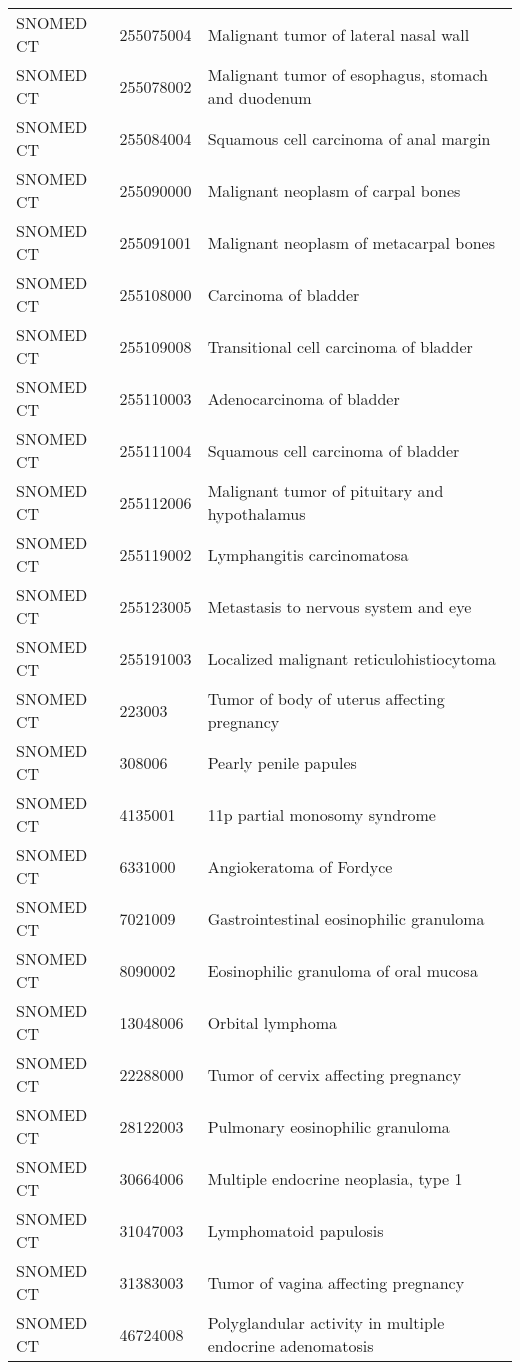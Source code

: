 \begin{longtable}{p{}p{}p{}}
  SNOMED CT & 255075004 & Malignant tumor of lateral nasal wall \\ 
  SNOMED CT & 255078002 & Malignant tumor of esophagus, stomach and duodenum \\ 
  SNOMED CT & 255084004 & Squamous cell carcinoma of anal margin \\ 
  SNOMED CT & 255090000 & Malignant neoplasm of carpal bones \\ 
  SNOMED CT & 255091001 & Malignant neoplasm of metacarpal bones \\ 
  SNOMED CT & 255108000 & Carcinoma of bladder \\ 
  SNOMED CT & 255109008 & Transitional cell carcinoma of bladder \\ 
  SNOMED CT & 255110003 & Adenocarcinoma of bladder \\ 
  SNOMED CT & 255111004 & Squamous cell carcinoma of bladder \\ 
  SNOMED CT & 255112006 & Malignant tumor of pituitary and hypothalamus \\ 
  SNOMED CT & 255119002 & Lymphangitis carcinomatosa \\ 
  SNOMED CT & 255123005 & Metastasis to nervous system and eye \\ 
  SNOMED CT & 255191003 & Localized malignant reticulohistiocytoma \\ 
  SNOMED CT & 223003 & Tumor of body of uterus affecting pregnancy \\ 
  SNOMED CT & 308006 & Pearly penile papules \\ 
  SNOMED CT & 4135001 & 11p partial monosomy syndrome \\ 
  SNOMED CT & 6331000 & Angiokeratoma of Fordyce \\ 
  SNOMED CT & 7021009 & Gastrointestinal eosinophilic granuloma \\ 
  SNOMED CT & 8090002 & Eosinophilic granuloma of oral mucosa \\ 
  SNOMED CT & 13048006 & Orbital lymphoma \\ 
  SNOMED CT & 22288000 & Tumor of cervix affecting pregnancy \\ 
  SNOMED CT & 28122003 & Pulmonary eosinophilic granuloma \\ 
  SNOMED CT & 30664006 & Multiple endocrine neoplasia, type 1 \\ 
  SNOMED CT & 31047003 & Lymphomatoid papulosis \\ 
  SNOMED CT & 31383003 & Tumor of vagina affecting pregnancy \\ 
  SNOMED CT & 46724008 & Polyglandular activity in multiple endocrine adenomatosis \\ 

\end{longtable}
